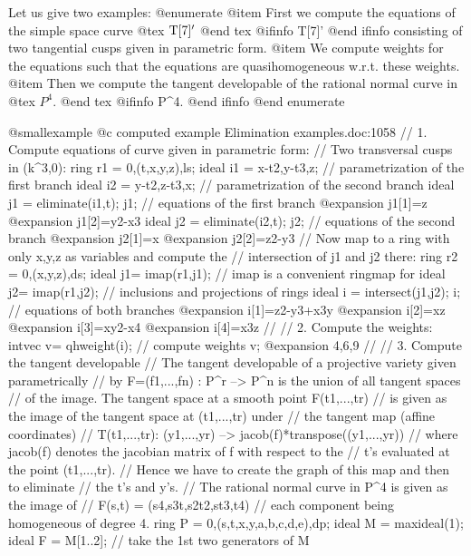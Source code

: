Let us give two examples:
@enumerate
@item
First we compute the equations of the simple space curve
@tex
$\hbox{T}[7]^\prime$
@end tex
@ifinfo
T[7]'
@end ifinfo
   consisting of two tangential cusps given in parametric form.
@item
We compute weights for the equations such that the
   equations are quasihomogeneous w.r.t. these weights.
@item
Then we compute the tangent developable of the rational
   normal curve in
@tex
$P^4$.
@end tex
@ifinfo
P^4.
@end ifinfo
@end enumerate

@smallexample
@c computed example Elimination examples.doc:1058 
  // 1. Compute equations of curve given in parametric form:
  // Two transversal cusps in (k^3,0):
  ring r1 = 0,(t,x,y,z),ls;
  ideal i1 = x-t2,y-t3,z;        // parametrization of the first branch
  ideal i2 = y-t2,z-t3,x;        // parametrization of the second branch
  ideal j1 = eliminate(i1,t);
  j1;                            // equations of the first branch
@expansion{} j1[1]=z
@expansion{} j1[2]=y2-x3
  ideal j2 = eliminate(i2,t);
  j2;                            // equations of the second branch
@expansion{} j2[1]=x
@expansion{} j2[2]=z2-y3
  // Now map to a ring with only x,y,z as variables and compute the
  // intersection of j1 and j2 there:
  ring r2 = 0,(x,y,z),ds;
  ideal j1= imap(r1,j1);         // imap is a convenient ringmap for
  ideal j2= imap(r1,j2);         // inclusions and projections of rings
  ideal i = intersect(j1,j2);
  i;                             // equations of both branches
@expansion{} i[1]=z2-y3+x3y
@expansion{} i[2]=xz
@expansion{} i[3]=xy2-x4
@expansion{} i[4]=x3z
  //
  // 2. Compute the weights:
  intvec v= qhweight(i);         // compute weights
  v;
@expansion{} 4,6,9
  //
  // 3. Compute the tangent developable
  // The tangent developable of a projective variety given parametrically
  // by F=(f1,...,fn) : P^r --> P^n is the union of all tangent spaces
  // of the image. The tangent space at a smooth point F(t1,...,tr)
  // is given as the image of the tangent space at (t1,...,tr) under
  // the tangent map (affine coordinates)
  //   T(t1,...,tr): (y1,...,yr) --> jacob(f)*transpose((y1,...,yr))
  // where jacob(f) denotes the jacobian matrix of f with respect to the
  // t's evaluated at the point (t1,...,tr).
  // Hence we have to create the graph of this map and then to eliminate
  // the t's and y's.
  // The rational normal curve in P^4 is given as the image of
  //        F(s,t) = (s4,s3t,s2t2,st3,t4)
  // each component being homogeneous of degree 4.
  ring P = 0,(s,t,x,y,a,b,c,d,e),dp;
  ideal M = maxideal(1);
  ideal F = M[1..2];     // take the 1st two generators of M
